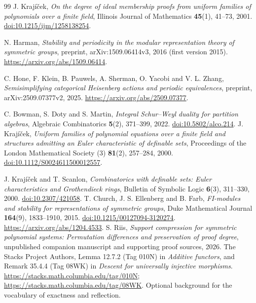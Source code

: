 \documentclass[11pt,a4paper,oneside,openany]{book}
\theoremstyle{definition}\newtheorem{definition}[theorem]{Definition}
\theoremstyle{remark}\newtheorem{remark}[theorem]{Remark}
\numberwithin{equation}{chapter}
\begin{document}
\begin{thebibliography}{99}
J. Kraj\'i\v cek, \emph{On the degree of ideal membership proofs from uniform
families of polynomials over a finite field}, Illinois Journal of
Mathematics \textbf{45}(1), 41--73, 2001.
\href{https://doi.org/10.1215/ijm/1258138254}{doi:10.1215/ijm/1258138254}.

N. Harman, \emph{Stability and periodicity in the modular representation
theory of symmetric groups}, preprint, arXiv:1509.06414v3, 2016 (first version 2015).
\url{https://arxiv.org/abs/1509.06414}.

C. Hone, F. Klein, B. Pauwels, A. Sherman, O. Yacobi and V. L. Zhang,
\emph{Semisimplifying categorical Heisenberg actions and periodic equivalences}, preprint,
arXiv:2509.07377v2, 2025.
\url{https://arxiv.org/abs/2509.07377}.

C. Bowman, S. Doty and S. Martin, \emph{Integral Schur--Weyl duality for
partition algebras}, Algebraic Combinatorics \textbf{5}(2), 371--399, 2022.
\href{https://doi.org/10.5802/alco.214}{doi:10.5802/alco.214}.
J. Kraj\'i\v cek, \emph{Uniform families of polynomial equations over a
finite field and structures admitting an Euler characteristic of definable
sets}, Proceedings of the London Mathematical Society (3)
\textbf{81}(2), 257--284, 2000.
\href{https://doi.org/10.1112/S0024611500012557}{doi:10.1112/S0024611500012557}.

J. Kraj\'i\v cek and T. Scanlon, \emph{Combinatorics with definable sets:
Euler characteristics and Grothendieck rings}, Bulletin of Symbolic Logic
\textbf{6}(3), 311--330, 2000.
\href{https://doi.org/10.2307/421058}{doi:10.2307/421058}.
T. Church, J. S. Ellenberg and B. Farb,
\emph{FI-modules and stability for representations of symmetric groups},
Duke Mathematical Journal \textbf{164}(9), 1833--1910, 2015.
\href{https://doi.org/10.1215/00127094-3120274}{doi:10.1215/00127094-3120274}.
\url{https://arxiv.org/abs/1204.4533}.
S. Riis, \emph{Support compression for symmetric polynomial systems:
Permutation differences and preservation of proof degree},
unpublished companion manuscript and supporting proof sources, 2026.
The Stacks Project Authors,
Lemma 12.7.2 (Tag 010N) in \emph{Additive functors}, and
Remark 35.4.4 (Tag 08WK) in \emph{Descent for universally injective morphisms}.
\url{https://stacks.math.columbia.edu/tag/010N};
\url{https://stacks.math.columbia.edu/tag/08WK}.
Optional background for the vocabulary of exactness and reflection.


\end{thebibliography}
\end{document}
